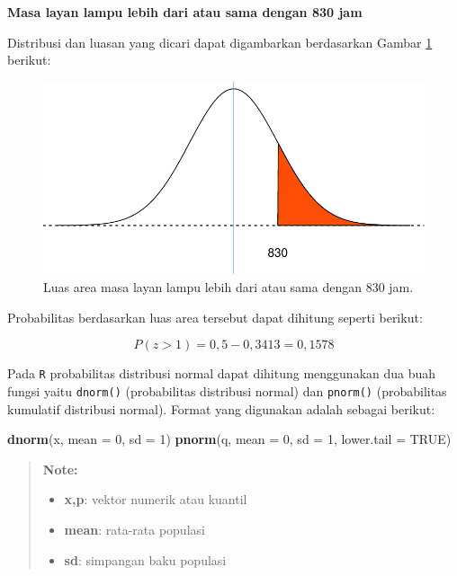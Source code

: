\documentclass[]{book}
\newenvironment{Shaded}{\begin{snugshade}}{\end{snugshade}}
\newcommand{\KeywordTok}[1]{\textcolor[rgb]{0.13,0.29,0.53}{\textbf{#1}}}
\newcommand{\DataTypeTok}[1]{\textcolor[rgb]{0.13,0.29,0.53}{#1}}
\newcommand{\DecValTok}[1]{\textcolor[rgb]{0.00,0.00,0.81}{#1}}
\newcommand{\OtherTok}[1]{\textcolor[rgb]{0.56,0.35,0.01}{#1}}
\newcommand{\NormalTok}[1]{#1}
\providecommand{\tightlist}{%
  \setlength{\itemsep}{0pt}\setlength{\parskip}{0pt}}
\begin{document}
\textbf{Masa layan lampu lebih dari atau sama dengan 830 jam}

Distribusi dan luasan yang dicari dapat digambarkan berdasarkan Gambar
\ref{fig:normvis6} berikut:

\begin{figure}

{\centering \includegraphics[width=0.7\linewidth]{EnvStat_files/figure-latex/normvis6-1} 

}

\caption{Luas area masa layan lampu lebih dari atau sama dengan 830 jam.}\label{fig:normvis6}
\end{figure}

Probabilitas berdasarkan luas area tersebut dapat dihitung seperti
berikut:

\[
P\left(z>1\right)=0,5-0,3413=0,1578
\]

Pada \texttt{R} probabilitas distribusi normal dapat dihitung
menggunakan dua buah fungsi yaitu \texttt{dnorm()} (probabilitas
distribusi normal) dan \texttt{pnorm()} (probabilitas kumulatif
distribusi normal). Format yang digunakan adalah sebagai berikut:

\begin{Shaded}
\begin{Highlighting}[]
\KeywordTok{dnorm}\NormalTok{(x, }\DataTypeTok{mean =} \DecValTok{0}\NormalTok{, }\DataTypeTok{sd =} \DecValTok{1}\NormalTok{)}
\KeywordTok{pnorm}\NormalTok{(q, }\DataTypeTok{mean =} \DecValTok{0}\NormalTok{, }\DataTypeTok{sd =} \DecValTok{1}\NormalTok{, }\DataTypeTok{lower.tail =} \OtherTok{TRUE}\NormalTok{)}
\end{Highlighting}
\end{Shaded}

\begin{quote}
\textbf{Note: }

\begin{itemize}
\tightlist
\item
  \textbf{x,p}: vektor numerik atau kuantil
\item
  \textbf{mean}: rata-rata populasi
\item
  \textbf{sd}: simpangan baku populasi
\end{itemize}
\end{quote}
\end{document}

